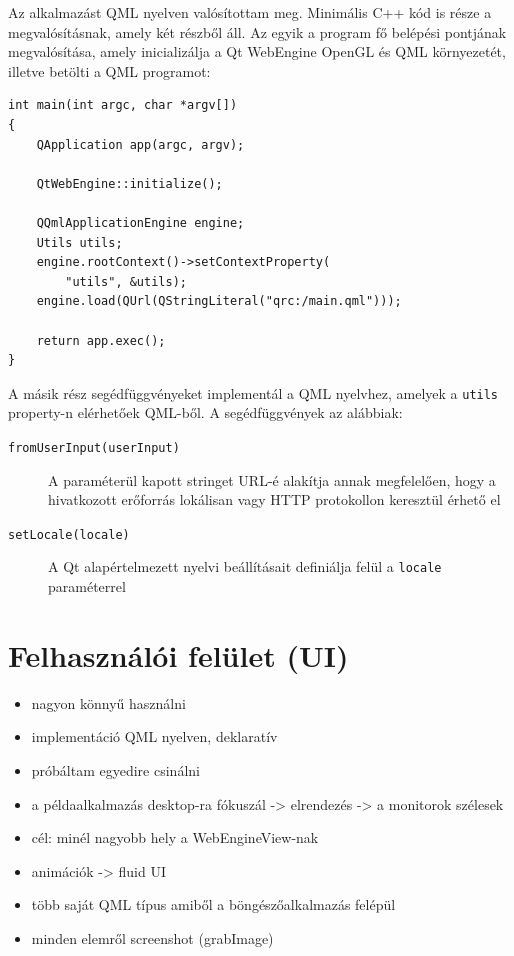 \documentclass[12pt]{report}
\begin{document}
Az alkalmazást QML nyelven valósítottam meg. Minimális C++ kód is része a megvalósításnak,
amely két részből áll. Az egyik a program fő belépési pontjának megvalósítása, amely
inicializálja a Qt WebEngine OpenGL és QML környezetét, illetve betölti a QML programot:
\begin{verbatim}
int main(int argc, char *argv[])
{
    QApplication app(argc, argv);

    QtWebEngine::initialize();

    QQmlApplicationEngine engine;
    Utils utils;
    engine.rootContext()->setContextProperty(
        "utils", &utils);
    engine.load(QUrl(QStringLiteral("qrc:/main.qml")));

    return app.exec();
}
\end{verbatim}
A másik rész segédfüggvényeket implementál a QML nyelvhez, amelyek a \texttt{utils}
property-n elérhetőek QML-ből. A segédfüggvények az alábbiak:
\begin{description}
    \item[\texttt{fromUserInput(userInput)}] A paraméterül kapott stringet URL-é alakítja
        annak megfelelően, hogy a hivatkozott erőforrás lokálisan vagy HTTP protokollon
        keresztül érhető el
    \item[\texttt{setLocale(locale)}] A Qt alapértelmezett nyelvi beállításait definiálja
        felül a \texttt{locale} paraméterrel
\end{description}

\section{Felhasználói felület (UI)}

\begin{itemize}
    \item nagyon könnyű használni
    \item implementáció QML nyelven, deklaratív
    \item próbáltam egyedire csinálni
    \item a példaalkalmazás desktop-ra fókuszál -> elrendezés -> a monitorok szélesek
    \item cél: minél nagyobb hely a WebEngineView-nak
    \item animációk -> fluid UI
    \item több saját QML típus amiből a böngészőalkalmazás felépül
    \item minden elemről screenshot (grabImage)
\end{itemize}
\end{document}
